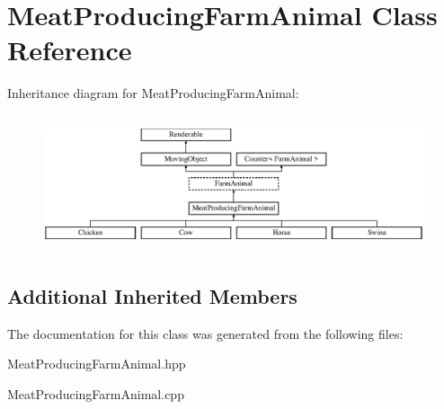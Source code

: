 \hypertarget{class_meat_producing_farm_animal}{}\section{Meat\+Producing\+Farm\+Animal Class Reference}
\label{class_meat_producing_farm_animal}
Inheritance diagram for Meat\+Producing\+Farm\+Animal\+:\begin{figure}[H]
\begin{center}
\leavevmode
\includegraphics[height=4.046243cm]{class_meat_producing_farm_animal}
\end{center}
\end{figure}
\subsection*{Additional Inherited Members}


The documentation for this class was generated from the following files\+:\begin{DoxyCompactItemize}
\item 
Meat\+Producing\+Farm\+Animal.\+hpp\item 
Meat\+Producing\+Farm\+Animal.\+cpp\end{DoxyCompactItemize}
